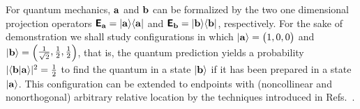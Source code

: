 \documentclass[%
  reprint,
  twocolumn,
 showpacs,
 showkeys,
 preprintnumbers,
 amsmath,amssymb,
 aps,
  prl,
  longbibliography,
 ]{revtex4-1}
\begin{document}
For quantum mechanics, ${\bf a}$ and ${\bf b}$ can be
formalized by the two one dimensional projection operators
$\textsf{\textbf{E}}_{\bf a} =\vert {\bf a} \rangle \langle {\bf a}\vert$ and
$\textsf{\textbf{E}}_{\bf b} =\vert {\bf b} \rangle \langle {\bf b}\vert$, respectively.
For the sake of demonstration we shall study configurations in which
$\vert {\bf a} \rangle = \begin{pmatrix}1,0,0\end{pmatrix}$
and
$\vert {\bf b} \rangle = \begin{pmatrix}   \frac{1}{\sqrt{2}},\frac{1}{2},\frac{1}{2} \end{pmatrix}$,
that is, the quantum prediction yields a probability $\vert \langle {\bf b} \vert {\bf a} \rangle \vert^2 = \frac{1}{2}$
to find
the quantum in a state $\vert {\bf b} \rangle$ if it has been prepared in a state $\vert {\bf a}\rangle$.
This configuration can be extended to endpoints with (noncollinear and nonorthogonal) arbitrary relative location
by the techniques introduced in Refs.~\cite{2015-AnalyticKS,Ramanathan-18}.
\end{document}
